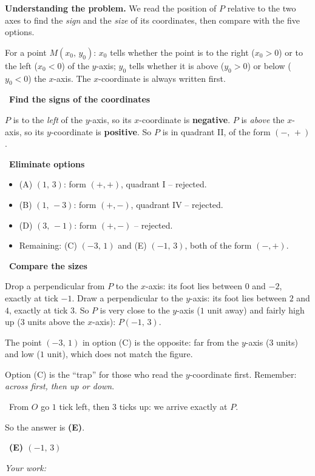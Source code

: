 \documentclass[11pt]{article}
\newif\ifsol \solfalse
\providecommand{\AnsWord}{Đáp số}
\newcommand{\StuProb}[2]{\begin{probboxS}{#1}{#2}\StuProbBody\end{probboxS}}
\newcommand{\ans}[1]{\par\smallskip{\bfseries\color{tmGreen!88!black}\AnsWord:}\ {\bfseries\color{AnsRed}#1}\par}
\newcommand{\probsol}[1]{%
  \begin{lrbox}{\solmeasure}\begin{minipage}{\dimexpr\linewidth-24pt\relax}#1\end{minipage}\end{lrbox}%
  \ifsol
    \begin{solbox}#1\end{solbox}%
  \else
    \setlength{\solht}{\dimexpr\ht\solmeasure+\dp\solmeasure+0.85cm\relax}%
    \ifdim\solht<1.35cm\setlength{\solht}{1.35cm}\fi
    \ifdim\solht>\StudentMaxWork\setlength{\solht}{\StudentMaxWork}\fi
    \par\noindent\begin{minipage}{\linewidth}%
    \expandafter\StuProb\StuProbArgs
    \begin{tcolorbox}[colback=white,colframe=Line,boxrule=0.8pt,arc=5pt,
      left=8pt,right=8pt,top=4pt,bottom=4pt,height=\solht]{\footnotesize\color{Slate}\itshape\WorkWord}\end{tcolorbox}%
    \end{minipage}\par\medskip
  \fi}
\newlength{\StudentMaxWork}\setlength{\StudentMaxWork}{4.5cm}
\newcommand{\step}[2]{\par\smallskip\noindent{\bfseries\color{tmBlue!85!black}\StepWord~#1.}\ {\bfseries #2}\par\nopagebreak}
\newcommand{\verify}[1]{\par\smallskip\noindent{\bfseries\color{tmGreen!80!black}\faCheckCircle\ \CheckWord}\ #1\par}
\def\WorkWord{Your work:}
\def\AnsWord{Answer}
\def\StepWord{Step}
\def\CheckWord{Check:}
\begin{document}
\probsol{
\textbf{Understanding the problem.} We read the position of $P$ relative to the two axes to find the \emph{sign} and the \emph{size} of its coordinates, then compare with the five options.
\begin{recallbox}For a point $M(x_0,\,y_0)$: $x_0$ tells whether the point is to the right ($x_0>0$) or to the left ($x_0<0$) of the $y$-axis; $y_0$ tells whether it is above ($y_0>0$) or below ($y_0<0$) the $x$-axis. The $x$-coordinate is always written first.\end{recallbox}
\step{1}{Find the signs of the coordinates}
$P$ is to the \emph{left} of the $y$-axis, so its $x$-coordinate is \textbf{negative}.
$P$ is \emph{above} the $x$-axis, so its $y$-coordinate is \textbf{positive}.
So $P$ is in quadrant II, of the form $(-,\,+)$.

\step{2}{Eliminate options}
\begin{itemize}[leftmargin=1.3em,itemsep=0pt,topsep=0pt]
  \item (A) $(1,\,3)$: form $(+,+)$, quadrant I -- rejected.
  \item (B) $(1,\,-3)$: form $(+,-)$, quadrant IV -- rejected.
  \item (D) $(3,\,-1)$: form $(+,-)$ -- rejected.
  \item Remaining: (C) $(-3,\,1)$ and (E) $(-1,\,3)$, both of the form $(-,+)$.
\end{itemize}

\step{3}{Compare the sizes}
Drop a perpendicular from $P$ to the $x$-axis: its foot lies between $0$ and $-2$, exactly at tick $-1$. Draw a perpendicular to the $y$-axis: its foot lies between $2$ and $4$, exactly at tick $3$. So $P$ is very close to the $y$-axis ($1$ unit away) and fairly high up ($3$ units above the $x$-axis): $P(-1,\,3)$.

The point $(-3,\,1)$ in option (C) is the opposite: far from the $y$-axis ($3$ units) and low ($1$ unit), which does not match the figure.
\begin{warnbox}Option (C) is the ``trap'' for those who read the $y$-coordinate first. Remember: \emph{across first, then up or down}.\end{warnbox}
\verify{From $O$ go $1$ tick left, then $3$ ticks up: we arrive exactly at $P$.}
So the answer is \textbf{(E)}.
\ans{(E) $(-1,\,3)$}
}
\end{document}
